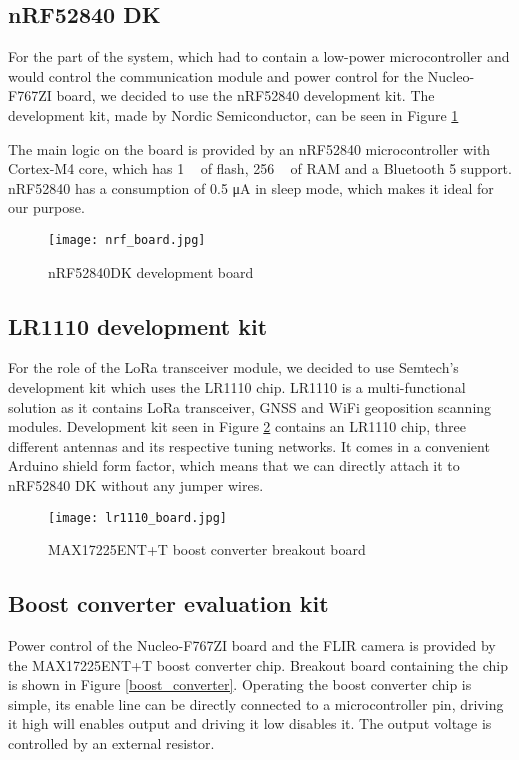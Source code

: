 \subsection{ nRF52840 DK}

For the part of the system, which had to contain a low-power microcontroller and would control the communication module and power control for the Nucleo-F767ZI board, we decided to use the nRF52840 development kit.
The development kit, made by Nordic Semiconductor, can be seen in Figure \ref{nrf_board}

The main logic on the board is provided by an nRF52840 microcontroller with Cortex-M4 core, which has 1 \si{\mega\byte} of flash, 256 \si{\kilo\byte} of RAM and a Bluetooth 5 support.
nRF52840 has a consumption of 0.5 \si{\micro\ampere} in sleep mode, which makes it ideal for our purpose.

\begin{figure}[ht]
        \centering
        \texttt{[image: nrf\_board.jpg]} 
        \caption{ nRF52840DK development board}
        \label{nrf_board}
\end{figure}

\subsection{ LR1110 development kit}

For the role of the LoRa transceiver module, we decided to use Semtech's development kit which uses the LR1110 chip.
LR1110 is a multi-functional solution as it contains LoRa transceiver, GNSS and WiFi geoposition scanning modules.
Development kit seen in Figure \ref{lr1110_board} contains an LR1110 chip, three different antennas and its respective tuning networks.
It comes in a convenient Arduino shield form factor, which means that we can directly attach it to nRF52840 DK without any jumper wires.

\begin{figure}[ht]
        \centering
        \texttt{[image: lr1110\_board.jpg]} 
        \caption{ MAX17225ENT+T boost converter breakout board}
        \label{lr1110_board}
\end{figure}

\subsection{ Boost converter evaluation kit}

Power control of the Nucleo-F767ZI board and the FLIR camera is provided by the MAX17225ENT+T boost converter chip.
Breakout board containing the chip is shown in Figure \ref{boost_converter}.
Operating the boost converter chip is simple, its enable line can be directly connected to a microcontroller pin, driving it high will enables output and driving it low disables it.
The output voltage is controlled by an external resistor.

